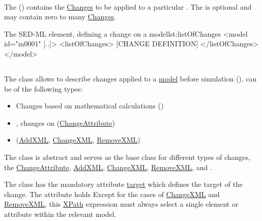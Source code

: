 \paragraph*{}
\label{sec:changesModel}
The  () contains the \hyperref[class:change]{Changes} to be applied to a particular \Model. The  is optional and may contain zero to many \hyperref[class:change]{Changes}.

\begin{myXmlLst}{The SED-ML  element, defining a change on a model}{lst:listOfChanges}
<model id="m0001" [..]>
	<listOfChanges>
		[CHANGE DEFINITION]
	</listOfChanges>
</model>
\end{myXmlLst}

\subsection{}
\label{class:change}
The  class allows to describe changes applied to a \hyperref[class:model]{model} before simulation ().  can be of the following types:
\begin{itemize}
	\item{Changes based on mathematical calculations (\ComputeChange)} 
	\item{, changes on  (\hyperref[class:changeAttribute]{ChangeAttribute})}	
	\item{ (\hyperref[class:addXml]{AddXML}, \hyperref[class:changeXml]{ChangeXML}, \hyperref[class:removeXml]{RemoveXML})}
\end{itemize}

The  class is abstract and serves as the base class for different types of changes, the \hyperref[class:changeAttribute]{ChangeAttribute}, \hyperref[class:addXml]{AddXML}, \hyperref[class:changeXml]{ChangeXML}, \hyperref[class:removeXml]{RemoveXML}, and \ComputeChange.

The  class has the mandatory attribute \hyperref[sec:changeTarget]{target} which defines the target of the change. The \hyperref[sec:changeTarget]{} attribute holds  Except for the cases of \hyperref[class:changeXml]{ChangeXML} and \hyperref[class:removeXml]{RemoveXML}, this \hyperref[sec:xpath]{XPath} expression must always select a single element or attribute within the relevant model.

